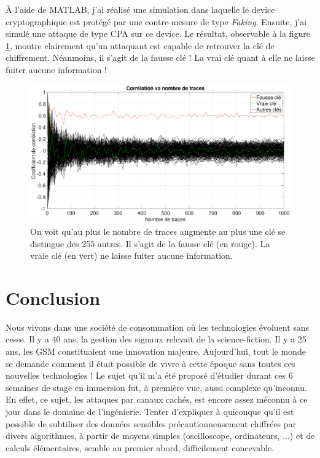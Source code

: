 \documentclass[oneside]{book}
\begin{document}
À l'aide de MATLAB, j'ai réalisé une simulation dans laquelle le device cryptographique est protégé par une contre-mesure de type \textit{Faking}. Ensuite, j'ai simulé une attaque de type CPA sur ce device. Le résultat, observable à la figure \ref{fig:faking}, montre clairement qu'un attaquant est capable de retrouver la clé de chiffrement. Néanmoins, il s'agit de la fausse clé ! La vrai clé quant à elle ne laisse fuiter aucune information !
\begin{figure}[htbp]
    \centering
    \hspace{-1 cm}
    \includegraphics[scale=0.24]{image/faking}
    \caption{On voit qu'au plus le nombre de traces augmente au plus une clé se distingue des 255 autres. Il s'agit de la fausse clé (en rouge). La vraie clé (en vert) ne laisse fuiter aucune information.}
    \label{fig:faking} 
\end{figure}


\newpage
\section{Conclusion}

Nous vivons dans une société de consommation où les technologies évoluent sans cesse. Il y a 40 ans, la gestion des signaux relevait de la science-fiction. Il y a 25 ans, les GSM constituaient une innovation majeure. Aujourd’hui, tout le monde se demande comment il était possible de vivre à cette époque sans toutes ces nouvelles technologies ! Le sujet qu'il m'a été proposé d'étudier durant ces 6 semaines de stage en immersion fut, à première vue, aussi complexe qu'inconnu. En effet, ce sujet, les attaques par canaux cachés, est encore assez méconnu à ce jour dans le domaine de l'ingénierie. Tenter d'expliquer à quiconque qu'il est possible de subtiliser des données sensibles précautionneusement chiffrées par divers algorithmes, à partir de moyens simples (oscilloscope, ordinateurs, ...) et de calculs élémentaires, semble au premier abord, difficilement concevable. 
\end{document}
